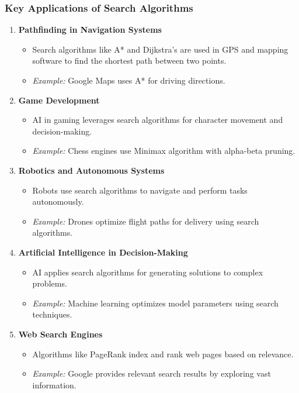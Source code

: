 \documentclass[aspectratio=169]{beamer}
\begin{document}
\begin{frame}
    \frametitle{Key Applications of Search Algorithms}
    \begin{enumerate}
        \item \textbf{Pathfinding in Navigation Systems}
        \begin{itemize}
            \item Search algorithms like A* and Dijkstra's are used in GPS and mapping software to find the shortest path between two points.
            \item \textit{Example:} Google Maps uses A* for driving directions.
        \end{itemize}
        
        \item \textbf{Game Development}
        \begin{itemize}
            \item AI in gaming leverages search algorithms for character movement and decision-making.
            \item \textit{Example:} Chess engines use Minimax algorithm with alpha-beta pruning.
        \end{itemize}
        
        \item \textbf{Robotics and Autonomous Systems}
        \begin{itemize}
            \item Robots use search algorithms to navigate and perform tasks autonomously.
            \item \textit{Example:} Drones optimize flight paths for delivery using search algorithms.
        \end{itemize}
        
        \item \textbf{Artificial Intelligence in Decision-Making}
        \begin{itemize}
            \item AI applies search algorithms for generating solutions to complex problems.
            \item \textit{Example:} Machine learning optimizes model parameters using search techniques.
        \end{itemize}
        
        \item \textbf{Web Search Engines}
        \begin{itemize}
            \item Algorithms like PageRank index and rank web pages based on relevance.
            \item \textit{Example:} Google provides relevant search results by exploring vast information.
        \end{itemize}
    \end{enumerate}
\end{frame}
\end{document}
